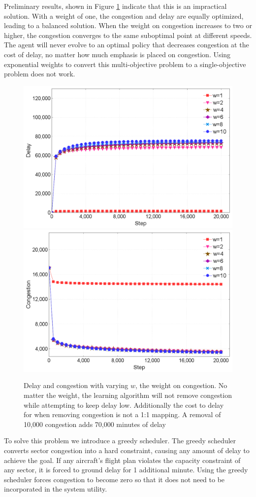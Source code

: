 \documentclass[onehalf,11pt]{beavtex}
\begin{document}
Preliminary results, shown in Figure \ref{delayCongestionPower} indicate that this is an impractical solution. With a weight of one, the congestion and delay are equally optimized, leading to a balanced solution. When the weight on congestion increases to two or higher, the congestion converges to the same suboptimal point at different speeds. The agent will never evolve to an optimal policy that decreases congestion at the cost of delay, no matter how much emphasis is placed on congestion. Using exponential weights to convert this multi-objective problem to a single-objective problem does not work.

\begin{figure}[]
\centering
\includegraphics[width=.75\columnwidth]{delayPower}
\includegraphics[width=.75\columnwidth]{congestionPower}
\caption{Delay and congestion with varying $w$, the weight on congestion. No matter the weight, the learning algorithm will not remove congestion while attempting to keep delay low. Additionally the cost to delay for when removing congestion is not a 1:1 mapping. A removal of 10,000 congestion adds 70,000 minutes of delay}
\label{delayCongestionPower}
\end{figure}

To solve this problem we introduce a greedy scheduler. The greedy scheduler converts sector congestion into a hard constraint, causing any amount of delay to achieve the goal. If any aircraft's flight plan violates the capacity constraint of any sector, it is forced to ground delay for 1 additional minute. Using the greedy scheduler forces congestion to become zero so that it does not need to be incorporated in the system utility.
\end{document}
